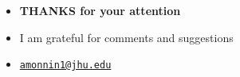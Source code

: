 \documentclass[pdflatex]{beamer}
\begin{document}
\begin{frame}
	
	\begin{itemize}
		\item[] \textbf{THANKS for your attention}
		\bigskip
		\item[] I am grateful for comments and suggestions
		\smallskip
		\item[] \href{mailto:amonnin1@jhu.edu}{\texttt{amonnin1@jhu.edu} }
	\end{itemize}
	
\end{frame}

\appendix

\end{document}
